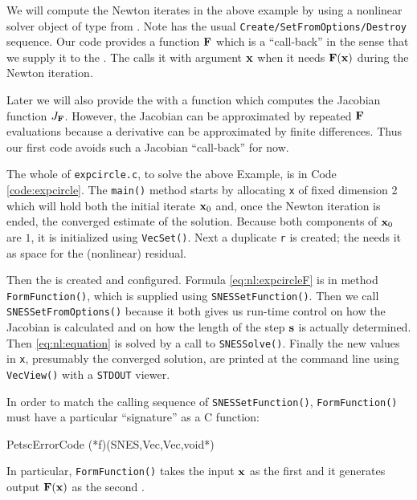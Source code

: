 We will compute the Newton iterates in the above example by using a nonlinear solver object of type \pSNES{} from \PETSc.  Note \pSNES has the usual \texttt{Create/SetFromOptions/Destroy} sequence.  Our code provides a function $\mathbf{F}$ which is a ``call-back'' in the sense that we supply it to the \pSNES.  The \pSNES calls it with argument $\mathbf{x}$ when it needs $\mathbf{F}(\mathbf{x})$ during the Newton iteration.

Later we will also provide the \pSNES with a function which computes the Jacobian function $J_{\mathbf{F}}$.  However, the Jacobian can be approximated by repeated $\mathbf{F}$ evaluations because a derivative can be approximated by finite differences.  Thus our first code avoids such a Jacobian ``call-back'' for now.

The whole of \texttt{expcircle.c}, to solve the above Example, is in Code \ref{code:expcircle}.  The \texttt{main()} method starts by allocating \pVec \texttt{x} of fixed dimension 2 which will hold both the initial iterate $\mathbf{x}_0$ and, once the Newton iteration is ended, the converged estimate of the solution.  Because both components of $\mathbf{x}_0$ are $1$, it is initialized using \texttt{VecSet()}.  Next a duplicate \pVec \texttt{r} is created; the \pSNES needs it as space for the (nonlinear) residual.

Then the \pSNES is created and configured.  Formula \eqref{eq:nl:expcircleF} is in method \texttt{FormFunction()}, which is supplied using \texttt{SNESSetFunction()}.  Then we call \texttt{SNESSetFromOptions()} because it both gives us run-time control on how the Jacobian is calculated and on how the length of the step $\mathbf{s}$ is actually determined.  Then \eqref{eq:nl:equation} is solved by a call to \texttt{SNESSolve()}.  Finally the new values in \texttt{x}, presumably the converged solution, are printed at the command line using \texttt{VecView()} with a \texttt{STDOUT} viewer.

\vfill
{}

In order to match the calling sequence of \texttt{SNESSetFunction()}, \texttt{FormFunction()} must have a particular ``signature'' as a C function:
\begin{code}
PetscErrorCode (*f)(SNES,Vec,Vec,void*)
\end{code}
In particular, \texttt{FormFunction()} takes the input $\mathbf{x}$ as the first \pVec and it generates output $\mathbf{F}(\mathbf{x})$ as the second \pVec.

